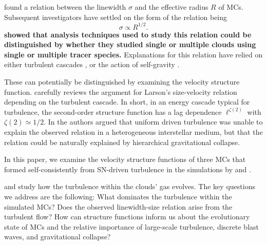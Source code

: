 \citet{Larson1981} found a relation between the linewidth $\sigma$ and the effective radius $R$ of MCs.
Subsequent investigators have settled on the form of the relation being \citep{Solomon1987,Falgarone2009,Heyer2009}
\begin{equation} \label{eq:larson}
    \sigma \propto R^{1/2}.
\end{equation}
\textbf{\citet{Goodman1998} showed that analysis techniques used to study this relation could be distinguished by whether they studied single or multiple clouds using single or multiple tracer species.}
Explanations for this relation have relied on either turbulent cascades \citep{Larson1981,Kritsuk2013,Kritsuk2015,Gnedin2015,Padoan2016}, or the action of self-gravity \citep{Elmegreen1993,Vazquez2006,Elmegreen2007,Heyer2009,Ballesteros2011}.


These can potentially be distinguished by examining the velocity structure function.
\citet{Kritsuk2013} carefully reviews the argument for Larson's size-velocity relation depending on the turbulent cascade. 
In short, in an energy cascade typical for turbulence, the second-order structure function has a lag dependence $\ell^{\zeta(2)}$ with $\zeta(2) \simeq 1/2$. 
In \citet[hereafter ]{IbanezMejia2016} the authors argued that uniform driven turbulence was unable to explain the observed relation in a heterogeneous interstellar medium, but that the relation could be naturally explained by hierarchical gravitational collapse.

In this paper, we examine the velocity structure functions of three MCs that formed self-consistently from SN-driven turbulence in the simulations by  and \citet[][hereafter ]{IbanezMejia2017}.

and study how the turbulence within the clouds' gas evolves.
The key questions we address are the following:
What dominates the turbulence within the simulated MCs? 
Does the observed linewidth-size relation arise from the turbulent flow?
How can structure functions inform us about the evolutionary state of MCs and the relative importance of large-scale turbulence, discrete blast waves, and gravitational collapse?

